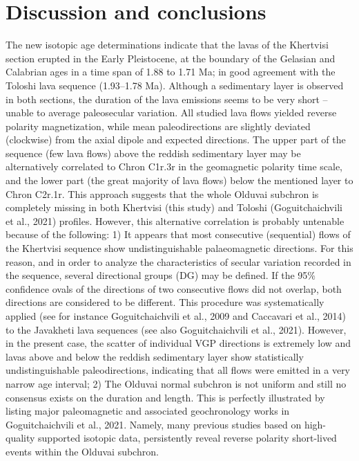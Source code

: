 \documentclass[review]{elsarticle}
\begin{document}
\section{Discussion and conclusions}
The new isotopic age determinations indicate that the lavas of the Khertvisi section erupted in the Early Pleistocene, at the boundary of the Gelasian and Calabrian ages in a time span of 1.88 to 1.71 Ma; in good
agreement with the Toloshi lava sequence (1.93–1.78 Ma). Although a sedimentary layer is observed in both sections, the duration of the lava emissions seems to be very short – unable to average paleosecular
variation. All studied lava flows yielded reverse polarity magnetization, while mean paleodirections are slightly deviated (clockwise) from the axial dipole and expected directions. The upper part of the sequence (few lava flows) above the reddish sedimentary layer may be alternatively correlated to Chron C1r.3r in the geomagnetic polarity time scale, and the lower part (the great majority of lava flows) below the
mentioned layer to Chron C2r.1r. This approach suggests that the whole Olduvai subchron is completely missing in both Khertvisi (this study) and Toloshi (Goguitchaichvili et al., 2021) profiles. However, this
alternative correlation is probably untenable because of the following: 1) It appears that most consecutive (sequential) flows of the Khertvisi sequence show undistinguishable palaeomagnetic directions. For this
reason, and in order to analyze the characteristics of secular variation recorded in the sequence, several directional groups (DG) may be defined. If the 95\% confidence ovals of the directions of two consecutive
flows did not overlap, both directions are considered to be different. This procedure was systematically applied (see for instance Goguitchaichvili et al., 2009 and Caccavari et al., 2014) to the Javakheti lava sequences (see also Goguitchaichvili et al., 2021). However, in the present case, the scatter of individual VGP directions is extremely low and lavas above and below the reddish sedimentary layer show statistically undistinguishable paleodirections, indicating that all flows were emitted in a very narrow age interval; 2) The Olduvai normal subchron is not uniform and still no consensus exists on the duration and length. This is
perfectly illustrated by listing major paleomagnetic and associated geochronology works in Goguitchaichvili et al., 2021. Namely, many previous studies based on high-quality supported isotopic data, persistently reveal reverse polarity short-lived events within the Olduvai subchron.
\\
\end{document}
